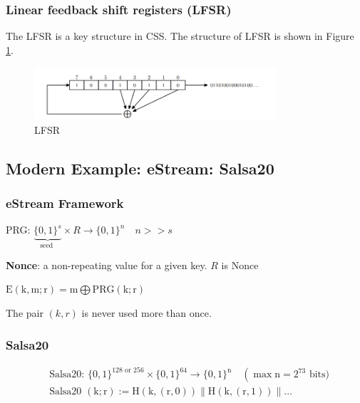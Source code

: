 \subsubsection{Linear feedback shift registers (LFSR)}

The LFSR is a key structure in CSS. The structure of LFSR is shown in Figure \ref{fig: 02 LFSR}.

\begin{figure}[h]
    \centering
    \includegraphics[width=0.8\textwidth]{Stanford_Crypto_1/fig/02_Stream_Cipher/LFSR.png}
    \caption{LFSR}
    \label{fig: 02 LFSR}
\end{figure}


\subsection{Modern Example: eStream: Salsa20}

\subsubsection{eStream Framework}

PRG: $\underbrace{\{0,1\}^{s}}_{\text {seed }} \times R \rightarrow\{0,1\}^{n} \quad n>>s$

\textbf{Nonce}: a non-repeating value for a given key. $R$ is Nonce

$\mathrm{E}(\mathrm{k}, \mathrm{m} ; \mathrm{r})=\mathrm{m} \bigoplus \mathrm{PRG}(\mathrm{k} ; \mathrm{r})$

The pair $(k, r)$ is never used more than once.


\subsubsection{Salsa20}

\begin{equation}
    \begin{aligned}
        &\text { Salsa20: }\{0,1\}^{128 \text { or } 256} \times\{0,1\}^{64} \longrightarrow\{0,1\}^{\mathrm{n}} \quad\left(\max \mathrm{n}=2^{73}\right. \text { bits) } \\
        &\text { Salsa20 }(\mathrm{k} ; \mathrm{r}):=\mathrm{H}(\mathrm{k},(\mathrm{r}, 0))\|\mathrm{H}(\mathrm{k},(\mathrm{r}, 1))\| \ldots
    \end{aligned}
\end{equation}

